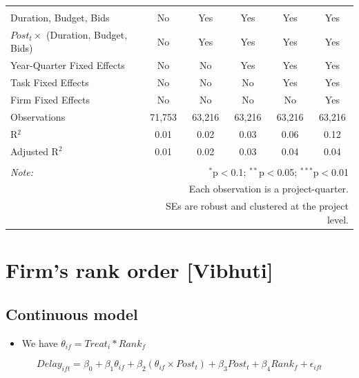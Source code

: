 \documentclass[
]{article}
\providecommand{\tightlist}{%
  \setlength{\itemsep}{0pt}\setlength{\parskip}{0pt}}
\begin{document}
\begin{table}[H]
\begin{tabular}{@{\extracolsep{-2pt}}lccccc}
  & & & & & \\ 
\hline \\[-1.8ex] 
Duration, Budget, Bids & No & Yes & Yes & Yes & Yes \\ 
$Post_t \times$  (Duration, Budget, Bids) & No & Yes & Yes & Yes & Yes \\ 
Year-Quarter Fixed Effects & No & No & Yes & Yes & Yes \\ 
Task Fixed Effects & No & No & No & Yes & Yes \\ 
Firm Fixed Effects & No & No & No & No & Yes \\ 
Observations & 71,753 & 63,216 & 63,216 & 63,216 & 63,216 \\ 
R$^{2}$ & 0.01 & 0.02 & 0.03 & 0.06 & 0.12 \\ 
Adjusted R$^{2}$ & 0.01 & 0.02 & 0.03 & 0.04 & 0.04 \\ 
\hline 
\hline \\[-1.8ex] 
\textit{Note:}  & \multicolumn{5}{r}{$^{*}$p$<$0.1; $^{**}$p$<$0.05; $^{***}$p$<$0.01} \\ 
 & \multicolumn{5}{r}{Each observation is a project-quarter.} \\ 
 & \multicolumn{5}{r}{SEs are robust and clustered at the project level.} \\ 
\end{tabular} 
\end{table}

\hypertarget{firms-rank-order-vibhuti}{%
\section{Firm's rank order
{[}Vibhuti{]}}\label{firms-rank-order-vibhuti}}

\hypertarget{continuous-model}{%
\subsection{Continuous model}\label{continuous-model}}

\begin{itemize}
\tightlist
\item
  We have \(\theta_{if} = Treat_i * Rank_f\)
\end{itemize}

\[ Delay_{ift} = \beta_0 + \beta_1 \theta_{if} + \beta_2 (\theta_{if} \times Post_t) + \beta_3 Post_t + \beta_4 Rank_f + \epsilon_{ift} \]
\end{document}
